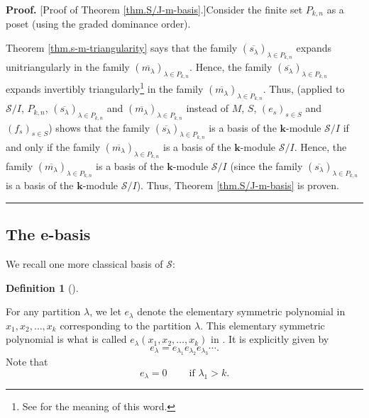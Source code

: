\documentclass[numbers=enddot,12pt,final,onecolumn,notitlepage]{scrartcl}%
\theoremstyle{definition}
\newtheorem{defi}[theo]{Definition}
\newenvironment{definition}[1][]
{\begin{defi}[#1]\begin{leftbar}}
{\end{leftbar}\end{defi}}
\newenvironment{proof}[1][Proof]{\noindent\textbf{#1.} }{\ \rule{0.5em}{0.5em}}
\begin{document}
\begin{proof}
[Proof of Theorem \ref{thm.S/J-m-basis}.]Consider the finite set $P_{k,n}$ as
a poset (using the graded dominance order).

Theorem \ref{thm.s-m-triangularity} says that the family $\left(
\overline{s_{\lambda}}\right)  _{\lambda\in P_{k,n}}$ expands unitriangularly
in the family $\left(  \overline{m_{\lambda}}\right)  _{\lambda\in P_{k,n}}$.
Hence, the family $\left(  \overline{s_{\lambda}}\right)  _{\lambda\in
P_{k,n}}$ expands invertibly triangularly\footnote{See \cite[Definition
11.1.16(b)]{GriRei18} for the meaning of this word.} in the family $\left(
\overline{m_{\lambda}}\right)  _{\lambda\in P_{k,n}}$. Thus, \cite[Corollary
11.1.19(e)]{GriRei18} (applied to $\mathcal{S}/I$, $P_{k,n}$, $\left(
\overline{s_{\lambda}}\right)  _{\lambda\in P_{k,n}}$ and $\left(
\overline{m_{\lambda}}\right)  _{\lambda\in P_{k,n}}$ instead of $M$, $S$,
$\left(  e_{s}\right)  _{s\in S}$ and $\left(  f_{s}\right)  _{s\in S}$) shows
that the family $\left(  \overline{s_{\lambda}}\right)  _{\lambda\in P_{k,n}}$
is a basis of the $\mathbf{k}$-module $\mathcal{S}/I$ if and only if the
family $\left(  \overline{m_{\lambda}}\right)  _{\lambda\in P_{k,n}}$ is a
basis of the $\mathbf{k}$-module $\mathcal{S}/I$. Hence, the family $\left(
\overline{m_{\lambda}}\right)  _{\lambda\in P_{k,n}}$ is a basis of the
$\mathbf{k}$-module $\mathcal{S}/I$ (since the family $\left(  \overline
{s_{\lambda}}\right)  _{\lambda\in P_{k,n}}$ is a basis of the $\mathbf{k}%
$-module $\mathcal{S}/I$). Thus, Theorem \ref{thm.S/J-m-basis} is proven.
\end{proof}

\subsection{The e-basis}

We recall one more classical basis of $\mathcal{S}$:

\begin{definition}
\label{def.elam}For any partition $\lambda$, we let $e_{\lambda}$ denote the
elementary symmetric polynomial in $x_{1},x_{2},\ldots,x_{k}$ corresponding to
the partition $\lambda$. This elementary symmetric polynomial is what is
called $e_{\lambda}\left(  x_{1},x_{2},\ldots,x_{k}\right)  $ in \cite[Chapter
2]{GriRei18}. It is explicitly given by%
\[
e_{\lambda}=e_{\lambda_{1}}e_{\lambda_{2}}e_{\lambda_{3}}\cdots.
\]
Note that%
\[
e_{\lambda}=0\ \ \ \ \ \ \ \ \ \ \text{if }\lambda_{1}>k.
\]

\end{definition}
\end{document}
